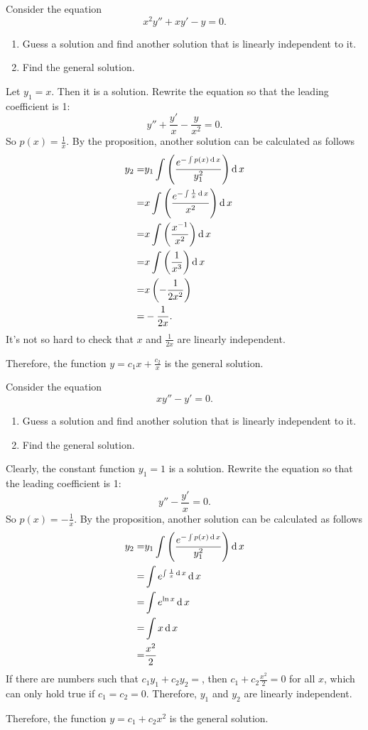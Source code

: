 \begin{example}
Consider the equation
\[x^2y'' + xy' - y=0.\]
\begin{enumerate}
  \item Guess a solution and find another solution that is linearly independent to it.
  \item Find the general solution.
\end{enumerate}
\end{example}
\begin{solution}
Let $y_1=x$. Then it is a solution.
Rewrite the equation so that the leading coefficient is 1:
\[y'' + \frac{y'}{x} - \frac{y}{x^2}=0.\]
So $p(x)=\frac1x$.
By the proposition, another solution can be calculated as follows
\[
\begin{aligned}
y_2=&y_1\int\left(\frac{e^{-\int p(x)\operatorname{d} x}}{y_1^2}\right)\operatorname{d} x\\
=&x\int\left(\frac{e^{-\int\frac1x \operatorname{d} x}}{x^2}\right)\operatorname{d} x\\
=&x\int\left(\frac{x^{-1}}{x^2}\right)\operatorname{d} x\\
=&x\int\left(\frac{1}{x^3}\right)\operatorname{d} x\\
=&x\left(-\frac{1}{2x^2}\right)\\
=&-\frac{1}{2x}.
\end{aligned}
\]
It's not so hard to check that $x$ and $\frac1{2x}$ are linearly independent.

Therefore, the function $y=c_1x+\frac{c_2}{x}$ is the general solution.
\end{solution}
\begin{exercise}
Consider the equation
\[xy'' - y'=0.\]
\begin{enumerate}
  \item Guess a solution and find another solution that is linearly independent to it.
  \item Find the general solution.
\end{enumerate}
\end{exercise}
\begin{exersol}
  Clearly, the constant function $y_1=1$ is a solution.
Rewrite the equation so that the leading coefficient is 1:
\[y'' - \frac{y'}{x}=0.\]
So $p(x)=-\frac1x$.
By the proposition, another solution can be calculated as follows
\[
\begin{aligned}
y_2=&y_1\int\left(\frac{e^{-\int p(x)\operatorname{d} x}}{y_1^2}\right)\operatorname{d} x\\
=&\int e^{\int\frac1x \operatorname{d} x} \operatorname{d} x\\
=&\int e^{\ln x} \operatorname{d} x\\
=&\int x\operatorname{d} x\\
=&\frac{x^2}{2}\\
\end{aligned}
\]
If there are numbers such that $c_1y_1+c_2y_2=$, then $c_1+c_2\frac{x^2}{2}=0$ for all $x$, which can only hold true if $c_1=c_2=0$. Therefore, $y_1$ and $y_2$ are linearly independent.

Therefore, the function $y=c_1+c_2x^2$ is the general solution.
\end{exersol}

